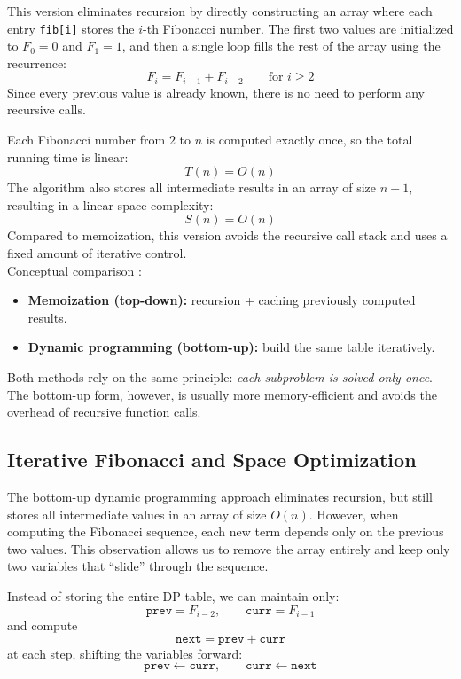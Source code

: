 \documentclass{article}
\begin{document}


This version eliminates recursion by directly constructing an array
where each entry \texttt{fib[i]} stores the $i$-th Fibonacci number.
The first two values are initialized to $F_0 = 0$ and $F_1 = 1$,
and then a single loop fills the rest of the array using the recurrence:
\[
	F_i = F_{i-1} + F_{i-2} \qquad \text{for } i \ge 2
\]
Since every previous value is already known, there is no need to perform any recursive calls.

Each Fibonacci number from $2$ to $n$ is computed exactly once,
so the total running time is linear:
\[
	T(n) = O(n)
\]
The algorithm also stores all intermediate results in an array of size $n + 1$,
resulting in a linear space complexity:
\[
	S(n) = O(n)
\]
Compared to memoization, this version avoids the recursive call stack and uses
a fixed amount of iterative control.
\\
Conceptual comparison :
\begin{itemize}
	\item \textbf{Memoization (top-down):} recursion + caching previously computed results.
	\item \textbf{Dynamic programming (bottom-up):} build the same table iteratively.
\end{itemize}

Both methods rely on the same principle:
\emph{each subproblem is solved only once}.
The bottom-up form, however, is usually more memory-efficient
and avoids the overhead of recursive function calls.


\subsection{Iterative Fibonacci and Space Optimization}

The bottom-up dynamic programming approach eliminates recursion,
but still stores all intermediate values in an array of size $O(n)$.
However, when computing the Fibonacci sequence, each new term depends only on the previous two values.
This observation allows us to remove the array entirely and keep only two variables that ``slide'' through the sequence.



Instead of storing the entire DP table, we can maintain only:
\[
	\texttt{prev} = F_{i-2}, \qquad \texttt{curr} = F_{i-1}
\]
and compute
\[
	\texttt{next} = \texttt{prev} + \texttt{curr}
\]
at each step, shifting the variables forward:
\[
	\texttt{prev} \leftarrow \texttt{curr}, \qquad
	\texttt{curr} \leftarrow \texttt{next}
\]
\end{document}
